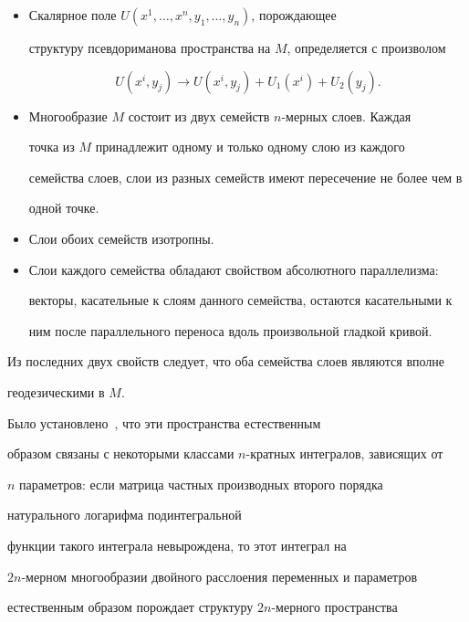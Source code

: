 \begin{itemize}


\item[1.] Скалярное поле $U(x^1,\dotsc, x^n, y_1, \dotsc, y_n)$, порождающее


структуру псевдориманова пространства на $M$, определяется с произволом


$$


U(x^i, y_j)\to U(x^i, y_j)+U_1(x^i)+U_2(y_j).


$$


\item[2.] Многообразие $M$ состоит из двух семейств $n$-мерных слоев. Каждая


точка из $M$ принадлежит одному и только одному слою из каждого


семейства слоев, слои из разных семейств имеют пересечение не более чем в


одной точке.


\item[3.] Слои обоих семейств изотропны.


\item[4.] Слои каждого семейства обладают свойством абсолютного параллелизма:


векторы, касательные к слоям данного семейства, остаются касательными к


ним после параллельного переноса вдоль произвольной гладкой кривой.


\end{itemize}





Из последних двух свойств следует, что оба семейства слоев являются вполне


геодезическими в $M$.





Было установлено~\cite{ar4}, что эти пространства естественным


образом связаны с некоторыми классами $n$-кратных интегралов, зависящих от


$n$ параметров: если матрица частных производных второго порядка


натурального логарифма подинтегральной


функции такого интеграла невырождена, то этот интеграл на


$2n$-мерном многообразии двойного расслоения переменных и параметров


естественным образом порождает структуру $2n$-мерного пространства


